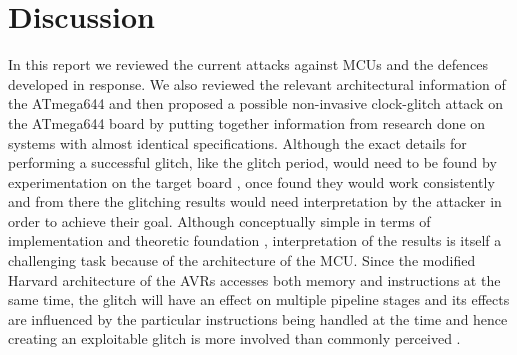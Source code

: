 \section{Discussion}
\label{sec:conclusion}
In this report we reviewed the current attacks against MCUs and the defences developed in response. We also reviewed the relevant architectural information of the ATmega644 and then proposed a possible non-invasive clock-glitch attack on the ATmega644 board by putting together information from research done on systems with almost identical specifications. Although the exact details for performing a successful glitch, like the glitch period, would need to be found by experimentation on the target board \citep{glitches_paper}, once found they would work consistently \citep{glitches_paper} and from there the glitching results would need interpretation by the attacker in order to achieve their goal. Although conceptually simple in terms of implementation and theoretic foundation \citep{sergei:thesis} \citep{glitches_paper}, interpretation of the results is itself a challenging task \citep{glitches_paper} because of the architecture of the MCU. Since the modified Harvard architecture of the AVRs accesses both memory and instructions at the same time, the glitch will have an effect on multiple pipeline stages and its effects are influenced by the particular instructions being handled at the time and hence creating an exploitable glitch is more involved than commonly perceived \citep{glitches_paper}. 

